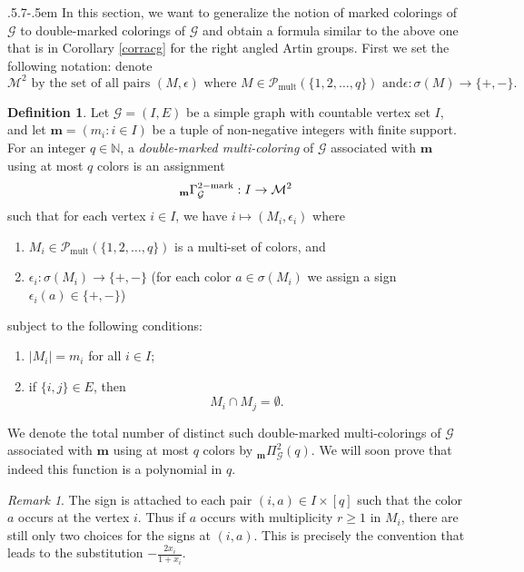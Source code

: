 \documentclass[11pt,reqno]{amsart}
\makeatletter
\numberwithin{equation}{section} %
\theoremstyle{definition}
\newtheorem{defn}{Definition}
\theoremstyle{remark}
\newtheorem{rem}{Remark}
\newcommand{\wt}{\operatorname{wt}}
\newcommand{\supp}{\operatorname{supp}}
\numberwithin{equation}{section}
\def\subsection{\def\@secnumfont{\bfseries}\@startsection{subsection}{2}%
  {\parindent}{.5\linespacing\@plus.7\linespacing}{-.5em}%
  {\normalfont\bfseries}}
\makeatother
\begin{document}
\subsection{} In this section, we want to generalize the notion of marked colorings of $\mathcal{G}$ to double-marked colorings of $\mathcal{G}$ and obtain a formula  similar to the above one that is in Corollary \ref{corracg} for the right angled Artin groups. First we set the following notation: denote  $$\text{
$\mathcal{M}^2$ by the set of all pairs $(M, \epsilon)$ where  $M\in \mathcal{P}_{\text{mult}}(\{1, 2, \ldots, q\})$ and
$\epsilon: \sigma(M)\to \{+, -\}$.
}$$
\begin{defn}
Let $\mathcal{G} = (I, E)$ be a simple graph with countable vertex set $I$, and let $\mathbf{m} = (m_i:i\in  I)$ be a tuple of non-negative integers with finite support. For an integer $q \in \mathbb{N}$, a \emph{double-marked multi-coloring} of $\mathcal{G}$ associated with $\mathbf{m}$ using at most $q$ colors is an assignment 
$$_{\bold{m}}\Gamma^{2-\mathrm{mark}}_\mathcal{G}:I\rightarrow \mathcal{M}^2 $$
such that for each vertex $i \in I$,  we have $i\mapsto (M_i, \epsilon_i)$ where
\begin{enumerate}
    \item[(a)]      $
    M_i \in \mathcal{P}_{\text{mult}}(\{1, 2, \ldots, q\})$
    is a multi-set of colors, and 
    \item[(b)] $\epsilon_i: \sigma(M_i)\to  \{+, -\}$ (for each color $a \in \sigma(M_i)$ we assign a sign 
    $
    \epsilon_i(a) \in \{+, -\}$)
\end{enumerate}
subject to the following conditions:
\begin{enumerate}
    \item $|M_i| = m_i$ for all $i \in I$;
    \item if $\{i, j\} \in E$, then
    \[
    M_i \cap M_j = \emptyset.
    \]
\end{enumerate}
We denote the total number of distinct such double-marked multi-colorings of $\mathcal{G}$ associated with $\mathbf{m}$ using at most $q$ colors by 
$_{\mathbf{m}}\Pi_\mathcal{G}^{2}( q).$ We will soon prove that indeed this function is a polynomial in $q.$
\end{defn}


\begin{rem}
The sign is attached to each pair \((i,a)\in I\times [q]\) such that the color \(a\) occurs at the vertex \(i\).
Thus if \(a\) occurs with multiplicity \(r\ge1\) in \(M_i\), there are still only two choices for
the signs at \((i,a)\). This is precisely the convention that leads to the
substitution $
-\frac{2x_i}{1+x_i}.$
\end{rem}

\end{document}
